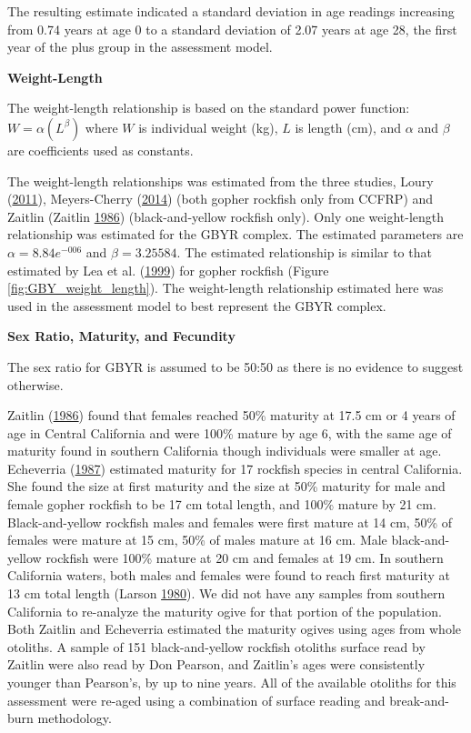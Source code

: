 \documentclass[12pt,]{article}
\begin{document}
The resulting estimate indicated a standard deviation in age readings
increasing from 0.74 years at age 0 to a standard deviation of 2.07
years at age 28, the first year of the plus group in the assessment
model.

\vspace{.5cm} \textbf{Weight-Length}

The weight-length relationship is based on the standard power function:
\(W = \alpha(L^\beta)\) where \(W\) is individual weight (kg), \(L\) is
length (cm), and \(\alpha\) and \(\beta\) are coefficients used as
constants.

The weight-length relationships was estimated from the three studies,
Loury (\protect\hyperlink{ref-Loury2011}{2011}), Meyers-Cherry
(\protect\hyperlink{ref-MeyersCherry2014}{2014}) (both gopher rockfish
only from CCFRP) and Zaitlin (Zaitlin
\protect\hyperlink{ref-Zaitlin1986}{1986}) (black-and-yellow rockfish
only). Only one weight-length relationship was estimated for the GBYR
complex. The estimated parameters are \(\alpha = 8.84e^{-006}\) and
\(\beta = 3.25584\). The estimated relationship is similar to that
estimated by Lea et al. (\protect\hyperlink{ref-Lea1999}{1999}) for
gopher rockfish (Figure \ref{fig:GBY_weight_length}). The weight-length
relationship estimated here was used in the assessment model to best
represent the GBYR complex.

\vspace{.5cm} \textbf{Sex Ratio, Maturity, and Fecundity}

The sex ratio for GBYR is assumed to be 50:50 as there is no evidence to
suggest otherwise.

Zaitlin (\protect\hyperlink{ref-Zaitlin1986}{1986}) found that females
reached 50\% maturity at 17.5 cm or 4 years of age in Central California
and were 100\% mature by age 6, with the same age of maturity found in
southern California though individuals were smaller at age. Echeverria
(\protect\hyperlink{ref-Echeverria1987}{1987}) estimated maturity for 17
rockfish species in central California. She found the size at first
maturity and the size at 50\% maturity for male and female gopher
rockfish to be 17 cm total length, and 100\% mature by 21 cm.
Black-and-yellow rockfish males and females were first mature at 14 cm,
50\% of females were mature at 15 cm, 50\% of males mature at 16 cm.
Male black-and-yellow rockfish were 100\% mature at 20 cm and females at
19 cm. In southern California waters, both males and females were found
to reach first maturity at 13 cm total length (Larson
\protect\hyperlink{ref-Larson1980}{1980}). We did not have any samples
from southern California to re-analyze the maturity ogive for that
portion of the population. Both Zaitlin and Echeverria estimated the
maturity ogives using ages from whole otoliths. A sample of 151
black-and-yellow rockfish otoliths surface read by Zaitlin were also
read by Don Pearson, and Zaitlin's ages were consistently younger than
Pearson's, by up to nine years. All of the available otoliths for this
assessment were re-aged using a combination of surface reading and
break-and-burn methodology.
\end{document}
